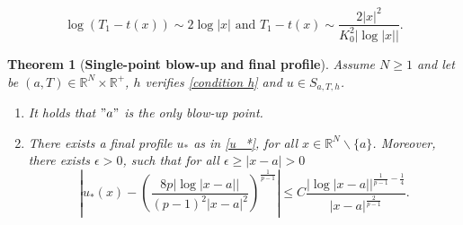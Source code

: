 \documentclass[10pt,a4paper]{amsart}
\newtheorem{theorem}{Theorem}
\newcommand{\R}{\numberset{R}}
\newcommand{\numberset}{\mathbb}
\begin{document}
\begin{equation}\label{equiv t(x)}
\log(T_1-t(x))\sim 2\log |x|\text{ and } T_1-t(x)\sim \frac{2|x|^2}{K_0^2|\log|x||}.
\end{equation}

\begin{theorem}[\textbf{Single-point blow-up and final profile}]\label{Thm 2 g}
Assume $N\geq 1$ and let be $(a,T)\in \R^N\times \R^+$, $h$ verifies \eqref{condition h} and $u\in S_{a,T,h}$.
\begin{enumerate}[label=(\roman*)]
\item It holds that $"a"$ is the only blow-up point.
\item There exists a final profile $u_*$ as in \eqref{u_*}, for all $x\in \R^N\backslash \{a\}$. Moreover, there exists $\epsilon>0$, such that for all $\epsilon\geq |x-a|> 0$\label{Thm 2 ii}
\begin{equation}\label{Thm 2}
\left|u_*(x)-\left(\frac{8p|\log|x-a||}{(p-1)^2|x-a|^{2}}\right)^{\frac{1}{p-1}}\right|\leq C\frac {|\log|x-a||^{\frac{1}{p-1} - \frac{1}{4}}} {|x-a|^{\frac{2}{p-1}}}.
\end{equation}
\end{enumerate}
\end{theorem}
\end{document}
